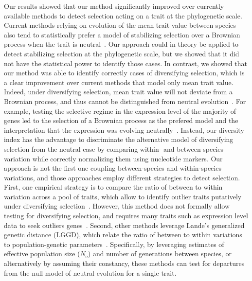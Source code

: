 \documentclass{article}
\newcommand{\Ne}{N_{\text{e}}}
\begin{document}
Our results showed that our method significantly improved over currently available methods to detect selection acting on a trait at the phylogenetic scale.
Current methods relying on evolution of the mean trait value between species also tend to statistically prefer a model of stabilizing selection over a Brownian process when the trait is neutral~\citep{silvestro_measurement_2015, cooper_cautionary_2016, price_detecting_2022}.
Our approach could in theory be applied to detect stabilizing selection at the phylogenetic scale, but we showed that it did not have the statistical power to identify those cases.
In contrast, we showed that our method was able to identify correctly cases of diversifying selection, which is a clear improvement over current methods that model only mean trait value.
Indeed, under diversifying selection, mean trait value will not deviate from a Brownian process, and thus cannot be distinguished from neutral evolution~\citep{hansen_translating_1996, harmon_phylogenetic_2018}.
For example, testing the selective regime in the expression level of the majority of genes led to the selection of a Brownian process as the prefered model and the interpretation that the expression was evolving neutrally~\citep{catalan_drift_2019}.
Instead, our diversity index has the advantage to discriminate the alternative model of diversifying selection from the neutral case by comparing within- and between-species variation while correctly normalizing them using nucleotide markers.
Our approach is not the first one coupling between-species and within-species variations, and those approaches employ different strategies to detect selection.
First, one empirical strategy is to compare the ratio of between to within variation across a pool of traits, which allow to identify outlier traits putatively under diversifying selection~\citep{rohlfs_modeling_2014}.
However, this method does not formally allow testing for diversifying selection, and requires many traits such as expression level data to seek outliers genes~\citep{rohlfs_phylogenetic_2015, gillard_comparative_2021}.
Second, other methods leverage Lande’s generalized genetic distance (LGGD), which relate the ratio of between to within variations to population-genetic parameters~\citep{lande_quantitative_1979, lynch_analysis_1990, lemos_evolutionary_2001, lemos_rates_2005, weaver_were_2007, porto_rate_2015}.
Specifically, by leveraging estimates of effective population size ($\Ne$) and number of generations between species, or alternatively by assuming their constancy, these methods can test for departures from the null model of neutral evolution for a single trait.
\end{document}
